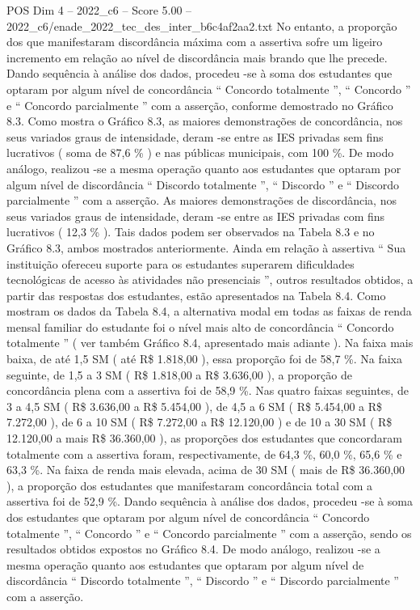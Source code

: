 \begin{textsample}{POS Dim 4 – 2022\_c6 – Score 5.00 – 2022\_c6/enade\_2022\_tec\_des\_inter\_b6c4af2aa2.txt}
No entanto, a proporção dos que manifestaram discordância máxima com a assertiva sofre um ligeiro incremento em relação ao nível de discordância mais brando que lhe precede.
Dando sequência à análise dos dados, procedeu -se à soma dos estudantes que optaram por algum nível de concordância “ Concordo totalmente ”, “ Concordo ” e “ Concordo parcialmente ” com a asserção, conforme demostrado no Gráfico 8.3.
Como mostra o Gráfico 8.3, as maiores demonstrações de concordância, nos seus variados graus de intensidade, deram -se entre as IES privadas sem fins lucrativos ( soma de 87,6 \% ) e nas públicas municipais, com 100 \%.
De modo análogo, realizou -se a mesma operação quanto aos estudantes que optaram por algum nível de discordância “ Discordo totalmente ”, “ Discordo ” e “ Discordo parcialmente ” com a asserção.
As maiores demonstrações de discordância, nos seus variados graus de intensidade, deram -se entre as IES privadas com fins lucrativos ( 12,3 \% ).
Tais dados podem ser observados na Tabela 8.3 e no Gráfico 8.3, ambos mostrados anteriormente.
Ainda em relação à assertiva “ Sua instituição ofereceu suporte para os estudantes superarem dificuldades tecnológicas de acesso às atividades não presenciais ”, outros resultados obtidos, a partir das respostas dos estudantes, estão apresentados na Tabela 8.4.
Como mostram os dados da Tabela 8.4, a alternativa modal em todas as faixas de renda mensal familiar do estudante foi o nível mais alto de concordância “ Concordo totalmente ” ( ver também Gráfico 8.4, apresentado mais adiante ).
Na faixa mais baixa, de até 1,5 SM ( até R\$ 1.818,00 ), essa proporção foi de 58,7 \%.
Na faixa seguinte, de 1,5 a 3 SM ( R\$ 1.818,00 a R\$ 3.636,00 ), a proporção de concordância plena com a assertiva foi de 58,9 \%.
Nas quatro faixas seguintes, de 3 a 4,5 SM ( R\$ 3.636,00 a R\$ 5.454,00 ), de 4,5 a 6 SM ( R\$ 5.454,00 a R\$ 7.272,00 ), de 6 a 10 SM ( R\$ 7.272,00 a R\$ 12.120,00 ) e de 10 a 30 SM ( R\$ 12.120,00 a mais R\$ 36.360,00 ), as proporções dos estudantes que concordaram totalmente com a assertiva foram, respectivamente, de 64,3 \%, 60,0 \%, 65,6 \% e 63,3 \%.
Na faixa de renda mais elevada, acima de 30 SM ( mais de R\$ 36.360,00 ), a proporção dos estudantes que manifestaram concordância total com a assertiva foi de 52,9 \%.
Dando sequência à análise dos dados, procedeu -se à soma dos estudantes que optaram por algum nível de concordância “ Concordo totalmente ”, “ Concordo ” e “ Concordo parcialmente ” com a asserção, sendo os resultados obtidos expostos no Gráfico 8.4.
De modo análogo, realizou -se a mesma operação quanto aos estudantes que optaram por algum nível de discordância “ Discordo totalmente ”, “ Discordo ” e “ Discordo parcialmente ” com a asserção.

\end{textsample}
